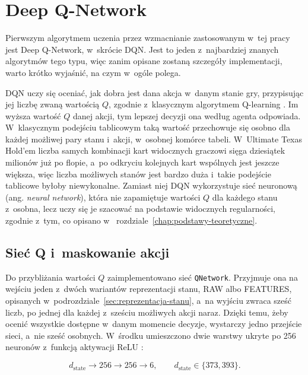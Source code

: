 \section{Deep Q-Network}
\label{sec:dqn}

Pierwszym algorytmem uczenia przez wzmacnianie zastosowanym w~tej pracy
jest Deep Q-Network, w~skrócie DQN. Jest to jeden
z~najbardziej znanych algorytmów tego typu, więc zanim opisane zostaną
szczegóły implementacji, warto krótko wyjaśnić, na czym
w~ogóle polega.

DQN uczy się oceniać, jak dobra jest dana akcja w~danym stanie gry,
przypisując jej liczbę zwaną wartością $Q$, zgodnie z~klasycznym
algorytmem Q-learning \cite{watkins_dayan_qlearning_1992,q_learning_geeksforgeeks}. Im wyższa wartość $Q$ danej
akcji, tym lepszej decyzji ona według agenta odpowiada. W~klasycznym
podejściu tablicowym taką wartość przechowuje się osobno dla każdej
możliwej pary stanu i~akcji, w~osobnej komórce tabeli. W~Ultimate Texas
Hold'em liczba samych kombinacji kart widocznych graczowi sięga dziesiątek
milionów już po flopie, a~po odkryciu kolejnych kart wspólnych jest jeszcze
większa, więc liczba możliwych stanów jest bardzo duża i~takie podejście
tablicowe byłoby niewykonalne. Zamiast niej DQN wykorzystuje sieć
neuronową (ang. \emph{neural network}), która
nie zapamiętuje wartości $Q$ dla każdego stanu z~osobna, lecz uczy się
je szacować na podstawie widocznych regularności, zgodnie z~tym, co
opisano w~
rozdziale~\ref{chap:podstawy-teoretyczne}.

\subsection{Sieć Q i~maskowanie akcji}

Do przybliżania wartości $Q$ zaimplementowano sieć \texttt{QNetwork}.
Przyjmuje ona na wejściu jeden z~dwóch wariantów reprezentacji stanu,
RAW albo FEATURES, opisanych w~podrozdziale~\ref{sec:reprezentacja-stanu},
a~na wyjściu zwraca sześć liczb, po jednej dla każdej z~sześciu możliwych
akcji naraz. Dzięki temu, żeby ocenić wszystkie dostępne w~danym momencie
decyzje, wystarczy jedno przejście sieci, a~nie sześć osobnych.
W~środku umieszczono dwie warstwy ukryte po 256 neuronów z~funkcją
aktywacji ReLU \cite{nair_hinton_relu_2010}:

\begin{equation}
    d_{\mathrm{state}}
    \rightarrow 256
    \rightarrow 256
    \rightarrow 6,
    \qquad
    d_{\mathrm{state}} \in \{373,393\}.
    \label{eq:dqn-architecture}
\end{equation}

